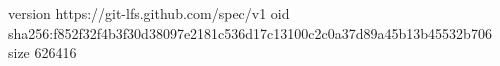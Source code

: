 version https://git-lfs.github.com/spec/v1
oid sha256:f852f32f4b3f30d38097e2181c536d17c13100c2c0a37d89a45b13b45532b706
size 626416
